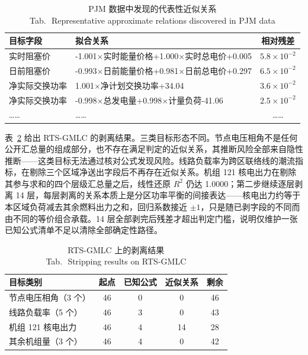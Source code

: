\documentclass[UTF8,zihao=5,twoside,fontset=none]{ctexart}
\newcommand{\tabbicaption}[2]{\caption{#1\\[-0.2em]\small Tab.\,\thetable\ #2}}
\begin{document}
\begin{table}[!tbp]
\centering
\tabbicaption{PJM 数据中发现的代表性近似关系}{Representative approximate relations discovered in PJM data}
\label{tab:formula}
\setlength{\tabcolsep}{2.6pt}
\begin{tabular}{p{1.72cm}p{3.62cm}c}
\toprule
目标字段 & 拟合关系 & 相对残差 \\
\midrule
实时阻塞价 & -1.001$\times$实时能量价格+1.000$\times$实时总电价+0.005 & $5.8\times10^{-2}$ \\
日前阻塞价 & -0.993$\times$日前能量价格+0.981$\times$日前总电价+0.297 & $6.5\times10^{-2}$ \\
净实际交换功率 & 1.001$\times$净计划交换功率+34.04 & $3.6\times10^{-2}$ \\
净实际交换功率 & -0.998$\times$总发电量+0.998$\times$计量负荷-41.06 & $2.5\times10^{-2}$ \\
…… & …… & …… \\
\bottomrule
\end{tabular}
\end{table}

表~\ref{tab:strip} 给出 RTS-GMLC 的剥离结果。三类目标形态不同。节点电压相角不是任何公开汇总量的组成部分，也不存在满足判定的近似关系，其推断风险全部来自隐性推断——这类目标无法通过核对公式发现风险。线路负载率为跨区联络线的潮流指标，在剔除三个区域净送出字段后不再存在近似关系。机组 121 核电出力在剔除其参与求和的四个层级汇总量之后，线性还原 $R^2$ 仍达 1.0000；第二步继续逐层剥离 14 层，每层剥离的关系本质上是分区功率平衡的间接表达——核电出力约等于本区域负荷减去其余燃料出力之和，回归系数接近 $\pm 1$，只是随已剥字段的不同而由不同的等价组合承载。14 层全部剥完后残差才超出判定门槛，说明仅维护一张已知公式清单不足以清除全部确定性路径。

\begin{table}[!tbp]
\centering
\tabbicaption{RTS-GMLC 上的剥离结果}{Stripping results on RTS-GMLC}
\label{tab:strip}
\setlength{\tabcolsep}{3.5pt}
\begin{tabular}{lcccc}
\toprule
目标类别 & 起点 & 已知公式 & 近似关系 & 剩余 \\
\midrule
节点电压相角（3 个） & 46 & 0 & 0 & 46 \\
线路负载率（5 个） & 46 & 3 & 0 & 43 \\
机组 121 核电出力 & 46 & 4 & 14 & 28 \\
其余机组量（3 个） & 46 & 4 & 0 & 42 \\
\bottomrule
\end{tabular}
\end{table}
\end{document}
